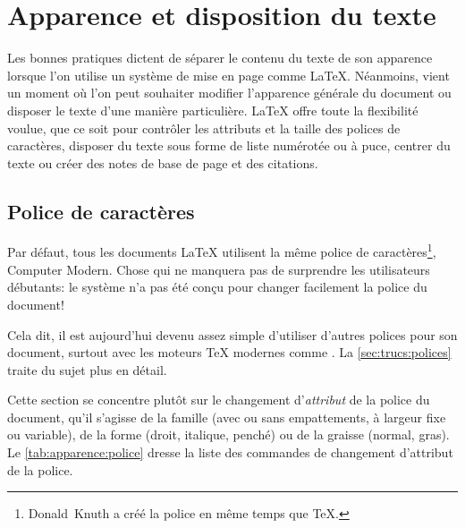 
\chapter{Apparence et disposition du texte}
\label{chap:apparence}

Les bonnes pratiques dictent de séparer le contenu du texte de son
apparence lorsque l'on utilise un système de mise en page comme
{\LaTeX}. Néanmoins, vient un moment où l'on peut souhaiter modifier
l'apparence générale du document ou disposer le texte d'une manière
particulière. {\LaTeX} offre toute la flexibilité voulue, que ce soit
pour contrôler les attributs et la taille des polices de caractères,
disposer du texte sous forme de liste numérotée ou à puce, centrer du
texte ou créer des notes de base de page et des citations.

\section{Police de caractères}
\label{sec:apparence:police}

Par défaut, tous les documents {\LaTeX} utilisent la même police de
caractères\footnote{%
  Donald~Knuth a créé la police en même temps que {\TeX}.}, %
{\selectfont Computer Modern}. Chose qui ne manquera
pas de surprendre les utilisateurs débutants: le système n'a pas été
conçu pour changer facilement la police du document!

Cela dit, il est aujourd'hui devenu assez simple d'utiliser d'autres
polices pour son document, surtout avec les moteurs
{\TeX} modernes comme {\XeTeX}. La \autoref{sec:trucs:polices} traite
du sujet plus en détail.

Cette section se concentre plutôt sur le changement d'\emph{attribut}
de la police du document, qu'il s'agisse de la famille (avec ou sans
empattements, à largeur fixe ou variable), de la forme (droit,
italique, penché) ou de la graisse (normal, gras). Le
\autoref{tab:apparence:police} dresse la liste des commandes de
changement d'attribut de la police.

